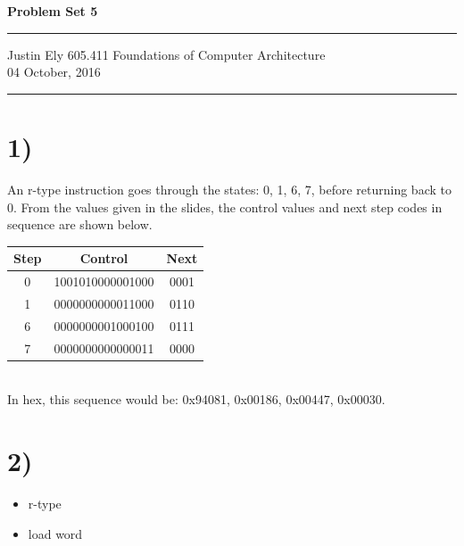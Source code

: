 \documentclass[a4paper,11pt]{article}
\begin{document}
\begin{flushright}

\vspace{1.1cm}

{\bf\Huge Problem Set 5}

\rule{0.25\linewidth}{0.5pt}

\vspace{0.5cm}
Justin Ely
\linebreak
\newline
\footnotesize{605.411 Foundations of Computer Architecture \\}
\vspace{0.5cm}
04 October, 2016
\end{flushright}

\noindent\rule{\linewidth}{1.0pt}


\section*{1)}
An r-type instruction goes through the states: 0, 1, 6, 7, before returning back to 0.  From the values given in the slides, 
the control values and next step codes in sequence are shown below. \\

\begin{tabular}{| c | c | c |}
  \hline	
       Step & Control & Next  \\  \hline
       0 & 1001010000001000 & 0001  \\  \hline
       1 & 0000000000011000 & 0110  \\  \hline
       6 & 0000000001000100 & 0111  \\  \hline
       7 & 0000000000000011 & 0000  \\  \hline
\end{tabular} \\

\noindent In hex, this sequence would be:  0x94081, 0x00186, 0x00447, 0x00030.



\section*{2)} 
\begin{itemize}
 \item r-type
 \item load word
\end{itemize}
\end{document}
